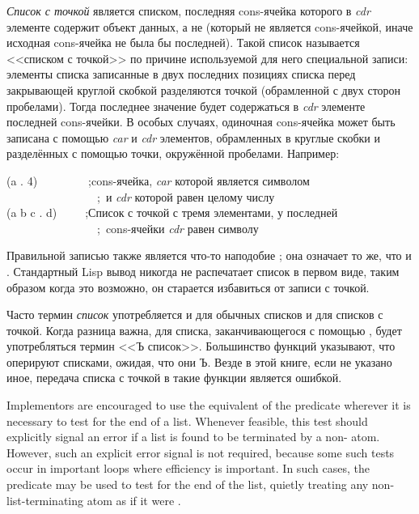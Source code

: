 \emph{Список с точкой} является списком, последняя cons-ячейка которого в
\emph{cdr} элементе содержит 
объект данных, а не {\nil} (который не является
cons-ячейкой, иначе исходная cons-ячейка не была бы последней).
Такой список называется <<списком с точкой>> по причине используемой для него
специальной записи: элементы списка записанные в двух последних позициях списка
перед закрывающей круглой скобкой разделяются точкой (обрамленной с двух сторон
пробелами). Тогда последнее значение будет содержаться в \emph{cdr} элементе
последней cons-ячейки. В особых случаях, одиночная cons-ячейка может быть
записана с помощью \emph{car} и \emph{cdr} элементов, обрамленных в круглые скобки
и разделённых с помощью точки, окружённой пробелами. 
Например:
\begin{lisp}
(a . 4)~~~~~~~~~;\textrm{cons-ячейка, \emph{car} которой является символом} \\
~~~~~~~~~~~~~~~~;~\textrm{и \emph{cdr} которой равен целому числу} \\
(a b c . d)~~~~~;\textrm{Список с точкой с тремя элементами, у последней} \\
~~~~~~~~~~~~~~~~;~\textrm{cons-ячейки \emph{cdr} равен символу }
\end{lisp}

Правильной записью также является что-то наподобие ;
она означает то же, что и . Стандартный Lisp вывод никогда не
распечатает список в первом виде, таким образом когда это возможно, он старается
избавиться от записи с точкой.

Часто термин \emph{список} употребляется и для обычных списков и для списков с
точкой. Когда разница важна, для списка, заканчивающегося с помощью {\nil},
будет употребляться термин <<Ъ список>>. Большинство функций указывают, что
оперируют списками, ожидая, что они Ъ. Везде в этой книге, если не указано иное,
передача списка с точкой в такие функции является ошибкой.

\beforenoterule
\begin{implementation}
Implementors are encouraged to use the equivalent
of the predicate  wherever it is necessary to test
for the end of a list.  Whenever feasible, this test should explicitly
signal an error if a list is found to be terminated by a non-{\nil} atom.
However, such an explicit error signal is not required, because
some such tests occur in important loops where efficiency is important.
In such cases, the predicate  may be used to test
for the end of the list, quietly treating any non-{\nil} list-terminating
atom as if it were {\nil}.
\end{implementation}
\afternoterule

